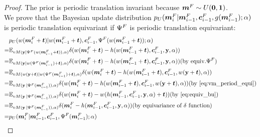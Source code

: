 \begin{proof}
    The prior is periodic translation invariant because $\bm{m}^F\sim U(\boldsymbol{0},\boldsymbol{1})$.\\
    We prove that the Bayesian update distribution $p_U(\bm{m}^F_{i}|\bm{m}^F_{i-1},\bm{c}^F_{i-1},g(\bm{m}^F_{i-1});\alpha)$ is periodic translation equivariant if $\Psi^F$ is periodic translation equivariant:
    \begin{align*}
    &p_U(w(\bmF_{i}+\vt)|w(\bmF_{i-1}+\vt),\bcF_{i-1},\net^F(w(\bmF_{i-1}+\vt));\alpha)\\
    =&\mathbb{E}_{vM(\bold{y}|\net^F(w(\bmF_{i-1}+\vt)),\alpha)}\delta(w(\bmF_{i}+\vt)-h(w(\bmF_{i-1}+\vt),\bcF_{i-1},\bold{y},\alpha))\\
    =&\mathbb{E}_{vM(\bold{y}|w(\net^F(\bmF_{i-1})+\vt),\alpha)}\delta(w(\bmF_{i}+\vt)-h(w(\bmF_{i-1}+\vt),\bcF_{i-1},\bold{y},\alpha))\text{(by equiv.} \net^F\text{)}\\
    =&\mathbb{E}_{vM(w(\bold{y}+\vt)|w(\net^F(\bmF_{i-1})+\vt),\alpha)}\delta(w(\bmF_{i}+\vt)-h(w(\bmF_{i-1}+\vt),\bcF_{i-1},w(\bold{y}+\vt),\alpha))\\
    =&\mathbb{E}_{vM(\y|\net^F(\bmF_{i-1})),\alpha)}\delta(w(\bmF_{i}+\vt)-h(w(\bmF_{i-1}+\vt),\bcF_{i-1},w(\bold{y}+\vt),\alpha))\text{(by \cref{eq:vm_period_equi})}\\
    =&\mathbb{E}_{vM(\y|\net^F(\bmF_{i-1})),\alpha)}\delta(w(\bmF_{i}+\vt)-w(h(\bmF_{i-1},\bcF_{i-1},\bold{y},\alpha)+\vt))\text{(by \cref{eq:equiv_bu})}\\
    =&\mathbb{E}_{vM(\y|\net^F(\bmF_{i-1})),\alpha)}\delta(\bmF_{i}-h(\bmF_{i-1},\bcF_{i-1},\bold{y},\alpha))  \text{(by equivariance of }\delta \text{ function)}\\
    =&p_U(\bmF_{i}|\bmF_{i-1},\bcF_{i-1},\net^F(\bmF_{i-1});\alpha)\\
    \end{align*}    

\end{proof}
